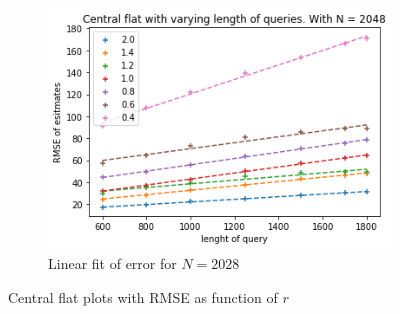 \documentclass[11pt]{article}
\theoremstyle{definition}
\begin{document}
\begin{figure}[H]
\begin{subfigure}{.4\textwidth}
  \includegraphics[width=\linewidth]{figures/central_flat/varying_r/cen_flat_varying_length_N_linear_=2048.png}
  \caption{Linear fit of error for $N=2028$}
  \label{fig:cen_r_sub3_lin}
\end{subfigure}
\caption{Central flat plots with RMSE as function of $r$}
\label{fig:plt_cen_r_lin}
\end{figure}
\end{document}
